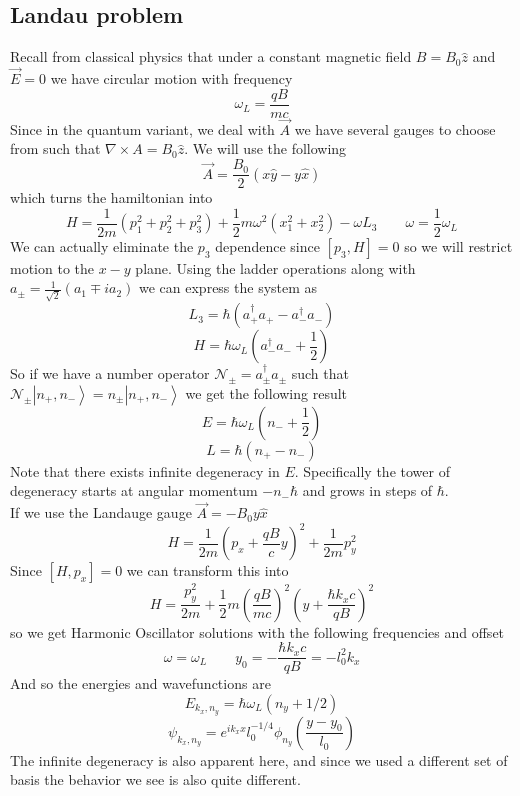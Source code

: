 \documentclass{article}
\newcommand{\ket}[1]{\left|#1\right\rangle}
\begin{document}
\subsection{Landau problem}
Recall from classical physics that under a constant magnetic field $B=B_0 \hat z$ and $\vec E = 0$ we have circular motion with frequency
$$\omega_L =\frac{qB}{mc}$$
Since in the quantum variant, we deal with $\vec A$ we have several gauges to choose from such that $\nabla \times A =B_0 \hat z$. We will use the following $$\vec A =\frac{B_0}{2}(x \hat y - y \hat x)$$
which turns the hamiltonian into
$$H=\frac{1}{2m}(p_1^2+p_2^2+p_3^2) + \frac{1}{2}m\omega^2 (x_1^2+x_2^2)-\omega L_3 \qquad \omega = \frac{1}{2}\omega_L$$
We can actually eliminate the $p_3$ dependence since $[p_3, H]=0$ so we will restrict motion to the $x-y$ plane. Using the ladder operations along with $a_{\pm} = \frac{1}{\sqrt{2}} (a_1 \mp ia_2)$ we can express the system as
$$L_3 = \hbar(a_+^{\dagger}a_+ -a_-^{\dagger}a_-)$$
$$H=\hbar\omega_L \left(a_-^{\dagger}a_-+\frac{1}{2}\right)$$
So if we have a number operator $\mathcal N_{\pm} = a_{\pm}^{\dagger} a_{\pm}$ such that $\mathcal N_{\pm} \ket{n_+,n_-} = n_{\pm}\ket{n_+, n_-}$ we get the following result
$$E=\hbar \omega_L \left(n_-+\frac{1}{2}\right)$$
$$L=\hbar(n_+ - n_-)$$
Note that there exists infinite degeneracy in $E$. Specifically the tower of degeneracy starts at angular momentum $-n_-\hbar$ and grows in steps of $\hbar$.
\\If we use the Landauge gauge $\vec A = -B_0y \hat x $
$$H=\frac{1}{2m} \left(p_x+\frac{qB}{c} y\right)^2+\frac{1}{2m} p_y^2$$
Since $[H, p_x]=0$ we can transform this into 
$$H=\frac{p_y^2}{2m}+\frac{1}{2}m\left(\frac{qB}{mc}\right)^2\left(y+\frac{\hbar k_x c}{qB}\right)^2$$
so we get Harmonic Oscillator solutions with the following frequencies and offset
$$\omega = \omega_L \qquad y_0 =-\frac{\hbar k_x c}{qB}=-l_0^2 k_x$$
And so the energies and wavefunctions are
$$E_{k_x, n_y} = \hbar \omega_L (n_y+1/2)$$
$$\psi_{k_x, n_y} = e^{ik_x x}l_0^{-1/4} \phi_{n_y} \left(\frac{y-y_0}{l_0}\right)$$
The infinite degeneracy is also apparent here, and since we used a different set of basis the behavior we see is also quite different.
\end{document}
